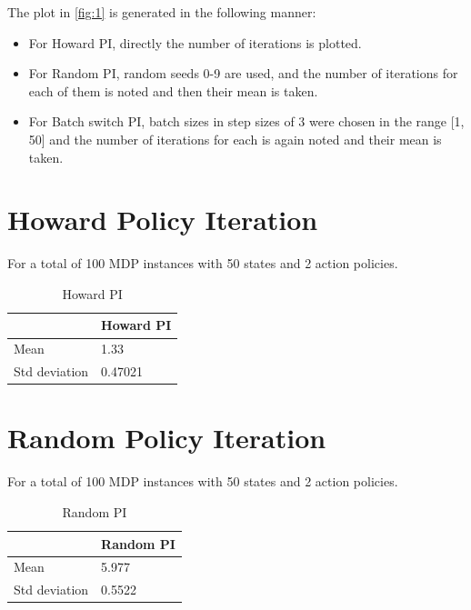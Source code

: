 \documentclass{article}
\begin{document}
The plot in \ref{fig:1} is generated in the following manner:
\begin{itemize}
\item For Howard PI, directly the number of iterations is plotted.
\item For Random PI, random seeds 0-9 are used, and the number of iterations for each of them is noted and then their mean is taken.
\item For Batch switch PI, batch sizes in step sizes of 3 were chosen in the range [1, 50] and the number of iterations for each is again noted and their mean is taken.
\end{itemize}
\section{Howard Policy Iteration}
For a total of 100 MDP instances with 50 states and 2 action policies.
\begin{table}[H]
\centering
\caption{Howard PI}
\label{t:hpi}
\begin{tabular}{|l|l|}
\hline
              & Howard PI \\ \hline
Mean          & 1.33      \\ \hline
Std deviation & 0.47021   \\ \hline
\end{tabular}
\end{table}

\section{Random Policy Iteration}
For a total of 100 MDP instances with 50 states and 2 action policies.
\begin{table}[H]
\centering
\caption{Random PI}
\label{t:rpi}
\begin{tabular}{|l|l|}
\hline
              & Random PI \\ \hline
Mean          & 5.977     \\ \hline
Std deviation & 0.5522    \\ \hline
\end{tabular}
\end{table}
\end{document}
